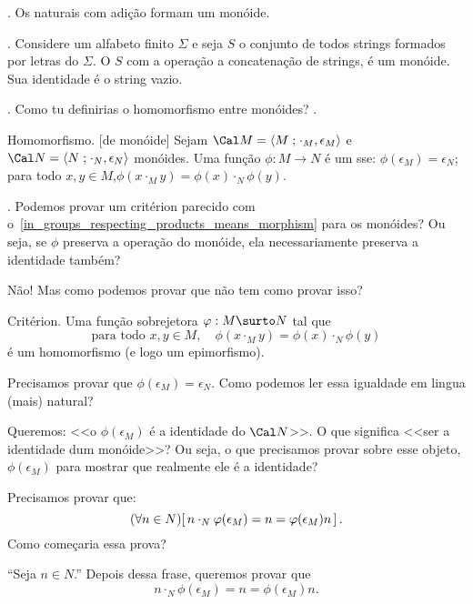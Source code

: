 \example.
Os naturais com adição formam um monóide.
\endexample

\example.
Considere um alfabeto finito $\Sigma$ e seja $S$ o conjunto de todos strings formados por letras do $\Sigma$.
O $S$ com a operação a concatenação de strings, é um monóide.  Sua identidade é o string vazio.
\endexample

\question.
Como tu definirias o homomorfismo entre monóides?
\spoiler.

 Homomorfismo.
\label{monoid_homomorphism}%
[de monóide]
Sejam $\cal M = \sset M {\cdot_M,\epsilon_M}$
e $\cal N = \sset N {\cdot_N,\epsilon_N}$ monóides.
Uma função $\phi : M \to N$ é um  sse:
\beginol
\li $\phi(\epsilon_M) = \epsilon_N$;
\li para todo $x,y\in M$,\quad $\phi(x \cdot_M y) = \phi(x) \cdot_N \phi(y)$.
\endol

\exercise.
\label{in_monoids_preservation_of_oper_does_not_imply_preservation_of_identity}%
Podemos provar um critérion parecido com
o~\ref{in_groups_respecting_products_means_morphism} para os monóides?
Ou seja, se $\phi$ preserva a operação do monóide,
ela necessariamente preserva a identidade também?

\hint
Não!
Mas como podemos provar que não tem como provar isso?

\endexercise

\exercise Critérion.
\label{monoid_epimorphism_criterion}%
Uma função sobrejetora $\phi : M \surto N$ tal que
$$
\text{para todo $x,y\in M$},\quad
\phi(x \cdot_M y) = \phi(x) \cdot_N \phi(y)
$$
é um homomorfismo (e logo um epimorfismo).

\hint
Precisamos provar que $\phi(\epsilon_M) = \epsilon_N$.
Como podemos ler essa igualdade em lingua (mais) natural?

\hint
Queremos: <<o $\phi(\epsilon_M)$ é a identidade do $\cal N$>>.
O que significa <<ser a identidade dum monóide>>?
Ou seja, o que precisamos provar sobre esse objeto, $\phi(\epsilon_M)$
para mostrar que realmente ele é a identidade?

\hint
Precisamos provar que:
$$
\left(\/\forall n \in N\right)\!\left[\thinspace n \cdot_N \varphi(\epsilon_M) = n = \varphi(\epsilon_M) n\thinspace\right].
$$
Como começaria essa prova?

\hint
``Seja $n \in N$.''
Depois dessa frase, queremos provar que
$$
n \cdot_N \phi(\epsilon_M) = n = \phi(\epsilon_M) n.
$$

